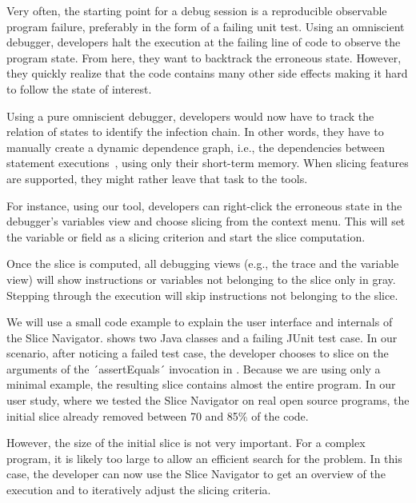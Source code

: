 \documentclass[
			english,
			review,
			]{elsarticle}
\begin{document}
Very often, the starting point for a debug session is a reproducible observable program failure, preferably in the form of a failing unit test.
Using an omniscient debugger, developers halt the execution at the failing line of code to observe the program state.
From here, they want to backtrack the erroneous state.
However, they quickly realize that the code contains many other side effects making it hard to follow the state of interest.

Using a pure omniscient debugger, developers would now have to track the relation of states to identify the infection chain. 
In other words, they have to manually create a dynamic dependence graph, i.e., the dependencies between statement executions~\cite{agrawal_dynamic_1990}, using only their short-term memory. 
When slicing features are supported, they might rather leave that task to the tools.

For instance, using our tool, developers can right-click the erroneous state in the debugger's variables view and choose slicing from the context menu.
This will set the variable or field as a slicing criterion and start the slice computation.

Once the slice is computed, all debugging views (e.g., the trace and the variable view) will show instructions or variables not belonging to the slice only in gray.
Stepping through the execution will skip instructions not belonging to the slice.

We will use a small code example to explain the user interface and internals of the Slice Navigator. 
shows two Java classes and a failing JUnit test case.
In our scenario, after noticing a failed test case, the developer chooses to slice on the arguments of the ´assertEquals´ invocation in .
Because we are using only a minimal example, the resulting slice contains almost the entire program.
In our user study, where we tested the Slice Navigator on real open source programs, the initial slice already removed between 70 and 85\% of the code.

However, the size of the initial slice is not very important. 
For a complex program, it is likely too large to allow an efficient search for the problem.
In this case, the developer can now use the Slice Navigator to get an overview of the execution and to iteratively adjust the slicing criteria.
\end{document}
